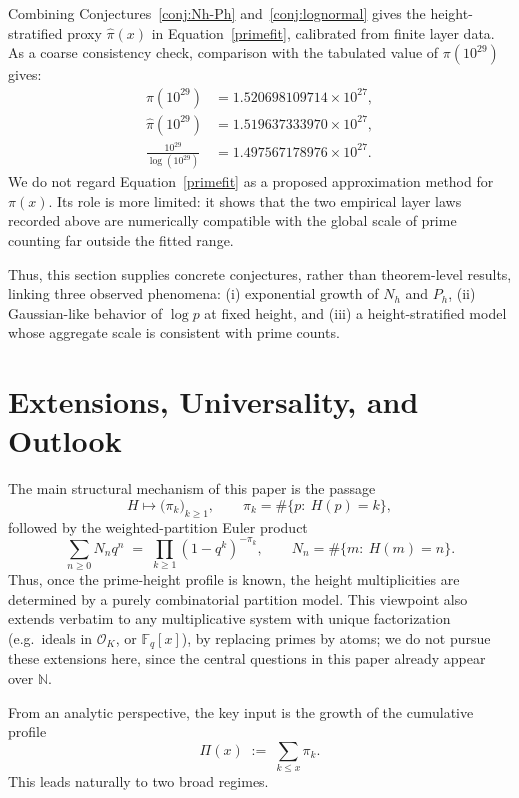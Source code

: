 \documentclass[11pt]{article}
\theoremstyle{definition}
\begin{document}
Combining Conjectures~\ref{conj:Nh-Ph} and~\ref{conj:lognormal} gives the
height-stratified proxy $\hat{\pi}(x)$ in Equation~\eqref{primefit}, calibrated from
finite layer data.  As a coarse consistency check, comparison with the tabulated
value of $\pi(10^{29})$ gives:
\[
\begin{aligned}
\pi(10^{29})&=1.520698109714\times 10^{27},\\
\hat{\pi}(10^{29})&=1.519637333970\times 10^{27},\\
\frac{10^{29}}{\log(10^{29})}&=1.497567178976\times 10^{27}.
\end{aligned}
\]
We do not regard Equation~\eqref{primefit} as a proposed approximation method for
$\pi(x)$.  Its role is more limited: it shows that the two empirical layer laws
recorded above are numerically compatible with the global scale of prime
counting far outside the fitted range.

Thus, this section supplies concrete conjectures, rather than theorem-level
results, linking three observed phenomena: (i) exponential growth of $N_h$ and
$P_h$, (ii) Gaussian-like behavior of $\log p$ at fixed height, and (iii) a
height-stratified model whose aggregate scale is consistent with prime counts.

\section{Extensions, Universality, and Outlook}
\label{sec9}

The main structural mechanism of this paper is the passage
\[
  H \longmapsto \bigl(\pi_k\bigr)_{k\ge1},
  \qquad
  \pi_k=\#\{p:\ H(p)=k\},
\]
followed by the weighted-partition Euler product
\[
  \sum_{n\ge0} N_n q^n \;=\; \prod_{k\ge1}(1-q^k)^{-\pi_k},
  \qquad
  N_n=\#\{m:\ H(m)=n\}.
\]
Thus, once the prime-height profile is known, the height multiplicities are
determined by a purely combinatorial partition model.  This viewpoint also
extends verbatim to any multiplicative system with unique factorization
(e.g.\ ideals in $\mathcal{O}_K$, or $\mathbb{F}_q[x]$), by replacing primes by
atoms; we do not pursue these extensions here, since the central questions in
this paper already appear over $\mathbb{N}$.


From an analytic perspective, the key input is the growth of the cumulative
profile
\[
  \Pi(x)\;:=\;\sum_{k\le x}\pi_k.
\]
This leads naturally to two broad regimes.
\end{document}
